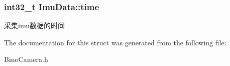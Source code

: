 \subsubsection[{\texorpdfstring{time}{time}}]{\setlength{\rightskip}{0pt plus 5cm}int32\+\_\+t Imu\+Data\+::time}\hypertarget{structImuData_a53ab25c90322decc7a9976428bca2f5f}{}\label{structImuData_a53ab25c90322decc7a9976428bca2f5f}
采集imu数据的时间 

The documentation for this struct was generated from the following file\+:\begin{DoxyCompactItemize}
\item 
Bino\+Camera.\+h\end{DoxyCompactItemize}
